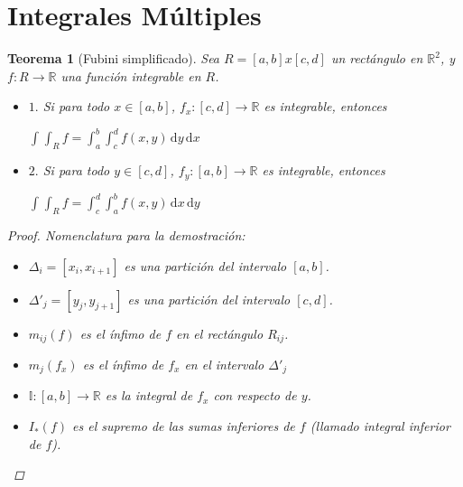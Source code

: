 \documentclass[]{article}
\newtheorem{teo}{Teorema}
\def\R{\mathbb{R}}
\newcommand{\dintegral}[7]{\int_{#1}^{#2} \! \int_{#3}^{#4} \! #5 \, \mathrm{d}#6 \, \mathrm{d}#7}
\newcommand{\dintres}[5]{\int_{#1}^{#2} \! \int_{#3}^{#4} \! #5}
\begin{document}
\section{Integrales Múltiples}
\begin{teo}[Fubini simplificado]
	Sea $R = [a,b]x[c,d]$ un rectángulo en $\R^2$, y $f:R\to\R$ una función integrable en $R$. 
	
	\begin{itemize}
		\item $1.$ Si para todo $x\in[a,b]$, $f_x:[c,d]\to\R$ es integrable, entonces
		\begin{center}
			$\displaystyle \dintres{}{}{R}{}{f} = \dintegral{a}{b}{c}{d}{f(x,y)}{y}{x}$
		\end{center}
		\item $2.$ Si para todo $y\in[c,d]$, $f_y:[a,b]\to\R$ es integrable, entonces
		\begin{center}
			$\displaystyle \dintres{}{}{R}{}{f} = \dintegral{c}{d}{a}{b}{f(x,y)}{x}{y}$
		\end{center}
	\end{itemize}
	\begin{proof}
		Nomenclatura para la demostración:
		\begin{itemize}
			\item $\Delta_i = [x_i,x_{i+1}]$ es una partición del intervalo $[a,b]$.
			\item $\Delta'_j = [y_j,y_{j+1}]$ es una partición del intervalo $[c,d]$.
			\item $m_{ij}(f)$ es el ínfimo de $f$ en el rectángulo $R_{ij}$.
			\item $m_j(f_x)$ es el ínfimo de $f_x$ en el intervalo $\Delta'_j$
			\item $\mathds{I}:[a,b]\to\R$ es la integral de $f_x$ con respecto de $y$.
			\item $I_*(f)$ es el supremo de las sumas inferiores de $f$ (llamado integral inferior de $f$).
		\end{itemize}
		

\end{proof}
\end{teo}
\end{document}
